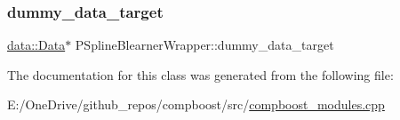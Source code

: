 \subsubsection{\texorpdfstring{dummy\+\_\+data\+\_\+target}{dummy\_data\_target}}
{\footnotesize\ttfamily \mbox{\hyperlink{classdata_1_1_data}{data\+::\+Data}}$\ast$ P\+Spline\+Blearner\+Wrapper\+::dummy\+\_\+data\+\_\+target\hspace{0.3cm}{\ttfamily [private]}}



The documentation for this class was generated from the following file\+:\begin{DoxyCompactItemize}
\item 
E\+:/\+One\+Drive/github\+\_\+repos/compboost/src/\mbox{\hyperlink{compboost__modules_8cpp}{compboost\+\_\+modules.\+cpp}}\end{DoxyCompactItemize}
